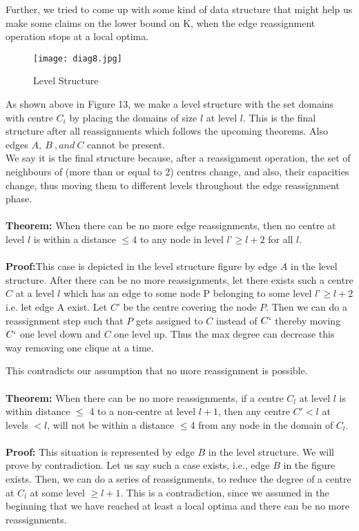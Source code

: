 \documentclass[12pt,a4paper,onecolumn]{article}
\begin{document}
Further, we tried to come up with some kind of data structure that might help us make some claims on the lower bound on K, when the edge reassignment operation stops at a local optima. \begin{figure}[H]
\texttt{[image: diag8.jpg]}
\caption{Level Structure}
\end{figure}
As shown above in Figure 13, we make a level structure with the set domains with centre $C_i$ by placing the domains of size $l$ at level $l$. This is the final structure after all reassignments which follows the upcoming theorems. Also edges $A,\: B \:, and \: C$ cannot be present.\\ We say it is the final structure because, after a reassignment operation, the set of neighbours of (more than or equal to 2) centres change, and also, their capacities change, thus moving them to different levels throughout the edge reassignment phase. \\\\\textbf{Theorem:}
When there can be no more edge reassignments, then no centre at level $l$ is within a distance $\leq 4$ to any node in level $l’ \geq l+2$ for all $l$. 
\\\\
\textbf{Proof:}This case is depicted in the level structure figure by edge $A$ in the level structure. After there can be no more reassignments, let there exists such a centre $C$ at a level $l$ which has an edge to some node P belonging to some level $l’ \geq l + 2$ i.e. let edge A exist. Let $C’$ be the centre covering the node $P$. Then we can do a reassignment step such that $P$ gets assigned to $C$ instead of $C`$ thereby moving $C`$ one level down and $C$ one level up. Thus the max degree can decrease this way removing one clique at a time. 

This contradicts our assumption that no more reassignment is possible.\\\\
\textbf{Theorem:} When there can be no more reassignments, if a centre $C_l$ at level $l$ is within distance $\leq$ 4 to a non-centre at level $l+1$, then any centre $C'< l$ at levels $< l$, will not be within a distance $\leq$4 from any node in the domain of $C_l$.\\\\
\textbf{Proof:}
This situation is represented by edge $B$ in the level structure. We will prove by contradiction. Let us say such a case exists, i.e., edge $B$ in the figure exists. Then, we can do a series of reassignments, to reduce the degree of a centre at $C_l$ at some level $\geq l + 1$. This is a contradiction, since we assumed in the beginning that we have reached at least a local optima and there can be no more reassignments.
\end{document}
